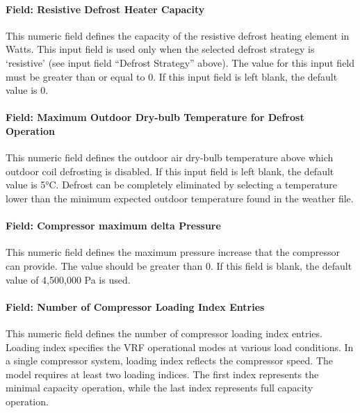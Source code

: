 \paragraph{Field: Resistive Defrost Heater Capacity}\label{field-resistive-defrost-heater-capacity-1-000}

This numeric field defines the capacity of the resistive defrost heating element in Watts. This input field is used only when the selected defrost strategy is `resistive' (see input field ``Defrost Strategy'' above). The value for this input field must be greater than or equal to 0. If this input field is left blank, the default value is 0.

\paragraph{Field: Maximum Outdoor Dry-bulb Temperature for Defrost Operation}\label{field-maximum-outdoor-dry-bulb-temperature-for-defrost-operation-1-000}

This numeric field defines the outdoor air dry-bulb temperature above which outdoor coil defrosting is disabled. If this input field is left blank, the default value is 5°C. Defrost can be completely eliminated by selecting a temperature lower than the minimum expected outdoor temperature found in the weather file.

\paragraph{Field: Compressor maximum delta Pressure}\label{field-compressor-maximum-delta-pressure}

This numeric field defines the maximum pressure increase that the compressor can provide. The value should be greater than 0. If this field is blank, the default value of 4,500,000 Pa is used.

\paragraph{Field: Number of Compressor Loading Index Entries}\label{field-number-of-compressor-loading-index-entries}

This numeric field defines the number of compressor loading index entries. Loading index specifies the VRF operational modes at various load conditions. In a single compressor system, loading index reflects the compressor speed. The model requires at least two loading indices. The first index represents the minimal capacity operation, while the last index represents full capacity operation.

